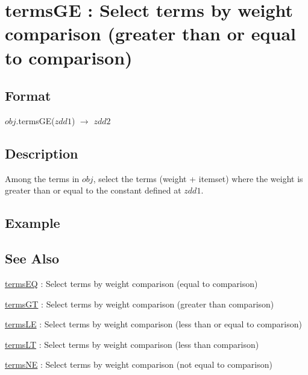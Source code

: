 
\section{termsGE : Select terms by weight comparison (greater than or equal to comparison)\label{sect:termsGE}}
\subsection*{Format}
$obj$.termsGE($zdd1$) $\rightarrow$ $zdd2$

\subsection*{Description}
Among the terms in $obj$, select the terms (weight + itemset) where the weight is greater than or equal to the constant defined at $zdd1$.

\subsection*{Example}


\subsection*{See Also}
\hyperref[sect:termsEQ]{termsEQ} : Select terms by weight comparison (equal to comparison)

\hyperref[sect:termsGT]{termsGT} : Select terms by weight comparison (greater than  comparison)

\hyperref[sect:termsLE]{termsLE} : Select terms by weight comparison (less than or equal to comparison)

\hyperref[sect:termsLT]{termsLT} : Select terms by weight comparison (less than comparison)

\hyperref[sect:termsNE]{termsNE} : Select terms by weight comparison (not equal to comparison)


